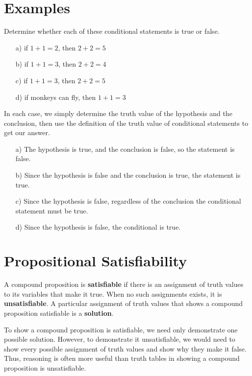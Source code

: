 \section{Examples}

\begin{ex}\cite[p.~14]{rosen}
  Determine whether each of these conditional statements is true or false.
  \begin{itemize}
    \item[a) ] if \(1+1=2\), then \(2+2=5\)
    \item[b) ] if \(1+1=3\), then \(2+2=4\)
    \item[c) ] if \(1+1=3\), then \(2+2=5\)
    \item[d) ] if monkeys can fly, then \(1+1=3\)
  \end{itemize}
  \begin{sol}
    In each case, we simply determine the truth value of the hypothesis and the conclusion, then use the definition of the truth value of conditional statements to get our answer.
    \begin{itemize}
      \item[a) ] The hypothesis is true, and the conclusion is false, so the statement is false.
      \item[b) ] Since the hypothesis is false and the conclusion is true, the statement is true.
      \item[c) ] Since the hypothesis is false, regardless of the conclusion the conditional statement must be true.
      \item[d) ] Since the hypothesis is false, the conditional is true.
    \end{itemize}
  \end{sol}
\end{ex}

\section{Propositional Satisfiability}

A compound proposition is \textbf{satisfiable} if there is an assignment of truth values to its variables that make it true.
When no such assignments exists, it is \textbf{unsatisfiable}.
A particular assignment of truth values that shows a compound proposition satisfiable is a \textbf{solution}.

To show a compound proposition is satisfiable, we need only demonstrate one possible solution.
However, to demonstrate it unsatisfiable, we would need to show every possible assignment of truth values and show why they make it false.
Thus, reasoning is often more useful than truth tables in showing a compound proposition is unsatisfiable.

